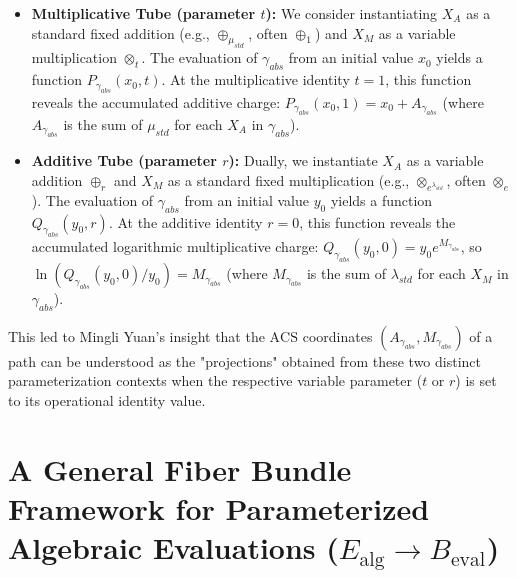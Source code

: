 \documentclass{article}[a4paper,12pt]
\begin{document}
\begin{itemize}
    \item \textbf{Multiplicative Tube (parameter $t$):} We consider instantiating $X_A$ as a standard fixed addition (e.g., $\oplus_{\mu_{std}}$, often $\oplus_1$) and $X_M$ as a variable multiplication $\otimes_t$. The evaluation of $\gamma_{abs}$ from an initial value $x_0$ yields a function $P_{\gamma_{abs}}(x_0, t)$. At the multiplicative identity $t=1$, this function reveals the accumulated additive charge: $P_{\gamma_{abs}}(x_0, 1) = x_0 + A_{\gamma_{abs}}$ (where $A_{\gamma_{abs}}$ is the sum of $\mu_{std}$ for each $X_A$ in $\gamma_{abs}$).
    \item \textbf{Additive Tube (parameter $r$):} Dually, we instantiate $X_A$ as a variable addition $\oplus_r$ and $X_M$ as a standard fixed multiplication (e.g., $\otimes_{e^{\lambda_{std}}}$, often $\otimes_e$). The evaluation of $\gamma_{abs}$ from an initial value $y_0$ yields a function $Q_{\gamma_{abs}}(y_0, r)$. At the additive identity $r=0$, this function reveals the accumulated logarithmic multiplicative charge: $Q_{\gamma_{abs}}(y_0, 0) = y_0 e^{M_{\gamma_{abs}}}$, so $\ln(Q_{\gamma_{abs}}(y_0,0)/y_0) = M_{\gamma_{abs}}$ (where $M_{\gamma_{abs}}$ is the sum of $\lambda_{std}$ for each $X_M$ in $\gamma_{abs}$).
\end{itemize}
This led to Mingli Yuan's insight that the $\mathrm{ACS}$ coordinates $(A_{\gamma_{abs}}, M_{\gamma_{abs}})$ of a path can be understood as the "projections" obtained from these two distinct parameterization contexts when the respective variable parameter ($t$ or $r$) is set to its operational identity value.

\section{A General Fiber Bundle Framework for Parameterized Algebraic Evaluations ($E_{\text{alg}} \to B_{\text{eval}}$)}
\end{document}
